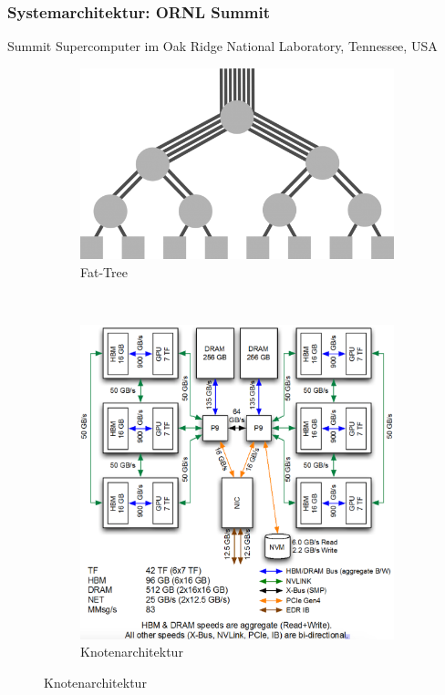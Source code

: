 {
	\frametitle{Systemarchitektur: ORNL Summit}
	\tiny Summit Supercomputer im Oak Ridge National Laboratory, Tennessee, USA\normalsize
	\begin{figure}[h!]
		\centering
		\begin{subfigure}[t]{0.3\linewidth}
			\includegraphics[width=1\linewidth]{../res/fat_tree.png}
			\footnotemark[1]
			\caption{Fat-Tree}
		\end{subfigure}
~
		\begin{subfigure}[t]{0.5\linewidth}
			\includegraphics[width=1\linewidth]{../res/architecture.png}
			\footnotemark[2]
			\caption{Knotenarchitektur}
		\end{subfigure}
	\end{figure}

\normalsize
}


